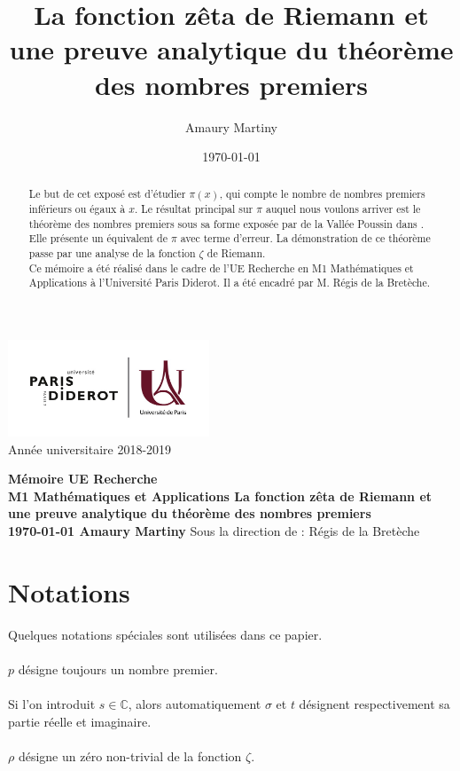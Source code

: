 \documentclass[french]{report}
\title{La fonction zêta de Riemann et une preuve analytique du théorème des nombres premiers}
\author{Amaury Martiny}
\date{\today}
\begin{document}
\begin{titlepage}
  \centering
  \includegraphics[width=6cm]{paris_diderot_logo.jpg}\\
  Année universitaire 2018-2019

  \vfill
  {\bfseries
    Mémoire UE Recherche\\
    M1 Mathématiques et Applications
    \vskip1cm
    \Large La fonction zêta de Riemann et une preuve analytique du théorème des nombres premiers\\
    \vskip1cm
    \normalsize \today
    \vskip1cm
    Amaury Martiny
  }    
  \vfill
  \vfill
  Sous la direction de :\hskip1cm Régis de la Bretèche
\end{titlepage}

\begin{abstract}
  Le but de cet exposé est d'étudier $\pi(x)$, qui compte le nombre de nombres premiers inférieurs ou égaux à $x$. Le résultat principal sur $\pi$ auquel nous voulons arriver est le théorème des nombres premiers sous sa forme exposée par de la Vallée Poussin dans \cite{valleepoussin}. Elle présente un équivalent de $\pi$ avec terme d'erreur. La démonstration de ce théorème passe par une analyse de la fonction $\zeta$ de Riemann.
  \\

  Ce mémoire a été réalisé dans le cadre de l'UE Recherche en M1 Mathématiques et Applications à l'Université Paris Diderot. Il a été encadré par M. Régis de la Bretèche.
\end{abstract}

\tableofcontents{}

\pagebreak
\section*{Notations}
Quelques notations spéciales sont utilisées dans ce papier.
\\\\
$p$ désigne toujours un nombre premier.
\\\\
Si l'on introduit $s\in\mathbb{C}$, alors automatiquement $\sigma$ et $t$ désignent respectivement sa partie réelle et imaginaire.
\\\\
$\rho$ désigne un zéro non-trivial de la fonction $\zeta$.
\end{document}
